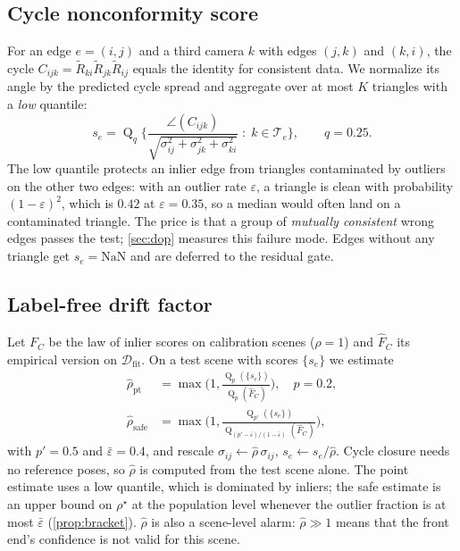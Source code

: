\subsection{Cycle nonconformity score}
For an edge $e=(i,j)$ and a third camera $k$ with edges $(j,k)$ and $(k,i)$, the cycle $C_{ijk}=\tilde R_{ki}\tilde R_{jk}\tilde R_{ij}$ equals the identity for consistent data. We normalize its angle by the predicted cycle spread and aggregate over at most $K$ triangles with a \emph{low} quantile:
\begin{equation}\label{eq:score}
s_e=\operatorname{Q}_{q}\Big\{\frac{\angle(C_{ijk})}{\sqrt{\sigma_{ij}^2+\sigma_{jk}^2+\sigma_{ki}^2}}\;:\;k\in\mathcal{T}_e\Big\},\qquad q=0.25.
\end{equation}
The low quantile protects an inlier edge from triangles contaminated by outliers on the other two edges: with an outlier rate $\varepsilon$, a triangle is clean with probability $(1-\varepsilon)^2$, which is $0.42$ at $\varepsilon=0.35$, so a median would often land on a contaminated triangle. The price is that a group of \emph{mutually consistent} wrong edges passes the test; \cref{sec:dop} measures this failure mode. Edges without any triangle get $s_e=\mathrm{NaN}$ and are deferred to the residual gate.

\subsection{Label-free drift factor}
Let $F_C$ be the law of inlier scores on calibration scenes ($\rho=1$) and $\hat F_C$ its empirical version on $\mathcal{D}_{\mathrm{fit}}$. On a test scene with scores $\{s_e\}$ we estimate
\begin{align}
\hat\rho_{\mathrm{pt}}&=\max\Big(1,\frac{\operatorname{Q}_{p}(\{s_e\})}{\operatorname{Q}_{p}(\hat F_C)}\Big),\quad p=0.2,\label{eq:rho}\\
\hat\rho_{\mathrm{safe}}&=\max\Big(1,\frac{\operatorname{Q}_{p'}(\{s_e\})}{\operatorname{Q}_{(p'-\bar\varepsilon)/(1-\bar\varepsilon)}(\hat F_C)}\Big),\label{eq:rhosafe}
\end{align}
with $p'=0.5$ and $\bar\varepsilon=0.4$, and rescale $\sigma_{ij}\leftarrow\hat\rho\,\sigma_{ij}$, $s_e\leftarrow s_e/\hat\rho$. Cycle closure needs no reference poses, so $\hat\rho$ is computed from the test scene alone. The point estimate uses a low quantile, which is dominated by inliers; the safe estimate is an upper bound on $\rho^\star$ at the population level whenever the outlier fraction is at most $\bar\varepsilon$ (\cref{prop:bracket}). $\hat\rho$ is also a scene-level alarm: $\hat\rho\gg1$ means that the front end's confidence is not valid for this scene.

